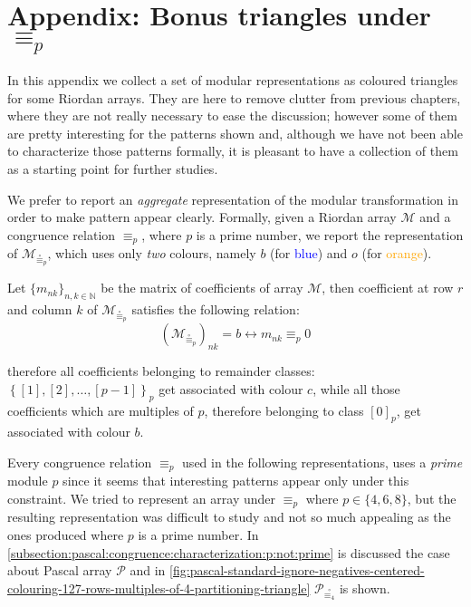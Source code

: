 
\chapter{Appendix: Bonus triangles under $\equiv_{p}$}

In this appendix we collect a set of modular representations as coloured
triangles for some Riordan arrays. They are here to remove clutter from
previous chapters, where they are not really necessary to ease the discussion;
however some of them are pretty interesting for the patterns shown and,
although we have not been able to characterize those patterns formally, it is
pleasant to have a collection of them as a starting point for further studies.

We prefer to report an \emph{aggregate} representation of the modular
transformation in order to make pattern appear clearly. Formally, given a
Riordan array $\mathcal{M}$ and a congruence relation $\equiv_{p}$, where $p$
is a prime number, we report the representation of
$\mathcal{M}_{\stackrel{\circ}\equiv_{p}}$, which uses only \emph{two} colours,
namely $b$ (for \textcolor{blue}{blue}) and $o$ (for
\textcolor{orange}{orange}). 

Let $\lbrace m_{nk}\rbrace_{n,k\in\mathbb{N}}$ be the matrix of coefficients of
array $\mathcal{M}$, then coefficient at row $r$ and column $k$ of
$\mathcal{M}_{\stackrel{\circ}\equiv_{p}}$ satisfies the following relation:
\begin{displaymath}
    \left(\mathcal{M}_{\stackrel{\circ}\equiv_{p}}\right)_{nk} = b 
    \leftrightarrow m_{nk}\equiv_{p}  0
\end{displaymath}

therefore all coefficients belonging to remainder classes:
$\left\lbrace[1],[2],\ldots,[p-1]\right\rbrace_{p}$ get associated with colour
$c$, while all those coefficients which are multiples of $p$, therefore
belonging to class $[0]_{p}$, get associated with colour $b$.

Every congruence relation $\equiv_{p}$ used in the following representations,
uses a \emph{prime} module $p$ since it seems that interesting patterns appear
only under this constraint. We tried to represent an array under $\equiv_{p}$
where $p\in\lbrace4,6,8\rbrace$, but the resulting representation was difficult
to study and not so much appealing as the ones produced where $p$ is a prime
number. In \autoref{subsection:pascal:congruence:characterization:p:not:prime}
is discussed the case about Pascal array $\mathcal{P}$ and in
\autoref{fig:pascal-standard-ignore-negatives-centered-colouring-127-rows-multiples-of-4-partitioning-triangle}
$\mathcal{P}_{\stackrel{\circ}{\equiv_{4}}}$ is shown.

